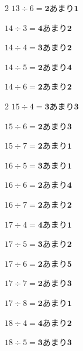 \documentclass[paper=a4, fontsize=11pt, jafontsize=11pt]{jlreq}
\begin{document}
\begin{center}
\begin{multicols*}{2}
$ 13 \div 6 = \bm{2} 　あまり　 \bm{1}$ \vspace*{\fill} 

$ 14 \div 3 = \bm{4} 　あまり　 \bm{2}$ \vspace*{\fill} 

$ 14 \div 4 = \bm{3} 　あまり　 \bm{2}$ \vspace*{\fill} 

$ 14 \div 5 = \bm{2} 　あまり　 \bm{4}$ \vspace*{\fill} 

$ 14 \div 6 = \bm{2} 　あまり　 \bm{2}$ \vspace*{\fill} 

\end{multicols*}
\newpage
\begin{multicols*}{2}
$ 15 \div 4 = \bm{3} 　あまり　 \bm{3}$ \vspace*{\fill} 

$ 15 \div 6 = \bm{2} 　あまり　 \bm{3}$ \vspace*{\fill} 

$ 15 \div 7 = \bm{2} 　あまり　 \bm{1}$ \vspace*{\fill} 

$ 16 \div 5 = \bm{3} 　あまり　 \bm{1}$ \vspace*{\fill} 

$ 16 \div 6 = \bm{2} 　あまり　 \bm{4}$ \vspace*{\fill} 

$ 16 \div 7 = \bm{2} 　あまり　 \bm{2}$ \vspace*{\fill} 

$ 17 \div 4 = \bm{4} 　あまり　 \bm{1}$ \vspace*{\fill} 

$ 17 \div 5 = \bm{3} 　あまり　 \bm{2}$ \vspace*{\fill} 

$ 17 \div 6 = \bm{2} 　あまり　 \bm{5}$ \vspace*{\fill} 

$ 17 \div 7 = \bm{2} 　あまり　 \bm{3}$ \vspace*{\fill} 

\columnbreak 
$ 17 \div 8 = \bm{2} 　あまり　 \bm{1}$ \vspace*{\fill} 

$ 18 \div 4 = \bm{4} 　あまり　 \bm{2}$ \vspace*{\fill} 

$ 18 \div 5 = \bm{3} 　あまり　 \bm{3}$ \vspace*{\fill} 


\end{multicols*}
\end{center}
\end{document}
